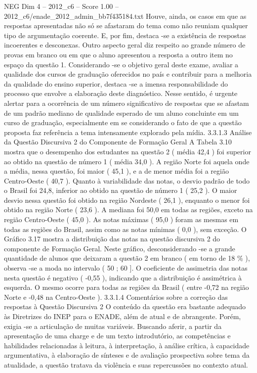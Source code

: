 \begin{textsample}{NEG Dim 4 – 2012\_c6 – Score 1.00 – 2012\_c6/enade\_2012\_admin\_bb7f435184.txt}
Houve, ainda, os casos em que as respostas apresentadas não só se afastaram do tema como não reuniam qualquer tipo de argumentação coerente.
E, por fim, destaca -se a existência de respostas incoerentes e desconexas.
Outro aspecto geral diz respeito ao grande número de provas em branco ou em que o aluno apresentou a resposta a outro item no espaço da questão 1.
Considerando -se o objetivo geral deste exame, avaliar a qualidade dos cursos de graduação oferecidos no país e contribuir para a melhoria da qualidade do ensino superior, destaca -se a imensa responsabilidade do processo que envolve a elaboração deste diagnóstico.
Nesse sentido, é urgente alertar para a ocorrência de um número significativo de respostas que se afastam de um padrão mediano de qualidade esperado de um aluno concluinte em um curso de graduação, especialmente em se considerando o fato de que a questão proposta faz referência a tema intensamente explorado pela mídia. 3.3.1.3 Análise da Questão Discursiva 2 do Componente de Formação Geral A Tabela 3.10 mostra que o desempenho dos estudantes na questão 2 ( média 42,4 ) foi superior ao obtido na questão de número 1 ( média 34,0 ).
A região Norte foi aquela onde a média, nessa questão, foi maior ( 45,1 ), e a de menor média foi a região Centro-Oeste ( 40,7 ).
Quanto à variabilidade das notas, o desvio padrão de todo o Brasil foi 24,8, inferior ao obtido na questão de número 1 ( 25,2 ).
O maior desvio nessa questão foi obtido na região Nordeste ( 26,1 ), enquanto o menor foi obtido na região Norte ( 23,6 ).
A mediana foi 50,0 em todas as regiões, exceto na região Centro-Oeste ( 45,0 ).
As notas máximas ( 95,0 ) foram as mesmas em todas as regiões do Brasil, assim como as notas mínimas ( 0,0 ), sem exceção.
O Gráfico 3.17 mostra a distribuição das notas na questão discursiva 2 do componente de Formação Geral.
Neste gráfico, desconsiderando -se a grande quantidade de alunos que deixaram a questão 2 em branco ( em torno de 18 \% ), observa -se a moda no intervalo ( 50 ; 60 ].
O coeficiente de assimetria das notas nesta questão é negativo ( -0,55 ), indicando que a distribuição é assimétrica à esquerda.
O mesmo ocorre para todas as regiões da Brasil ( entre -0,72 na região Norte e -0,48 na Centro-Oeste ). 3.3.1.4 Comentários sobre a correção das respostas à Questão Discursiva 2 O conteúdo da questão era bastante adequado às Diretrizes do INEP para o ENADE, além de atual e de abrangente.
Porém, exigia -se a articulação de muitas variáveis.
Buscando aferir, a partir da apresentação de uma charge e de um texto introdutório, as competências e habilidades relacionadas à leitura, à interpretação, à análise crítica, à capacidade argumentativa, à elaboração de sínteses e de avaliação prospectiva sobre tema da atualidade, a questão tratava da violência e suas repercussões no contexto atual.

\end{textsample}
